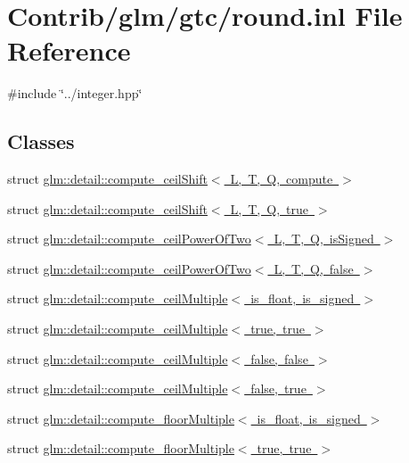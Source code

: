 \hypertarget{round_8inl}{}\section{Contrib/glm/gtc/round.inl File Reference}
\label{round_8inl}
{\ttfamily \#include \char`\"{}../integer.\+hpp\char`\"{}}\newline
\subsection*{Classes}
\begin{DoxyCompactItemize}
\item 
struct \mbox{\hyperlink{structglm_1_1detail_1_1compute__ceil_shift}{glm\+::detail\+::compute\+\_\+ceil\+Shift$<$ L, T, Q, compute $>$}}
\item 
struct \mbox{\hyperlink{structglm_1_1detail_1_1compute__ceil_shift_3_01_l_00_01_t_00_01_q_00_01true_01_4}{glm\+::detail\+::compute\+\_\+ceil\+Shift$<$ L, T, Q, true $>$}}
\item 
struct \mbox{\hyperlink{structglm_1_1detail_1_1compute__ceil_power_of_two}{glm\+::detail\+::compute\+\_\+ceil\+Power\+Of\+Two$<$ L, T, Q, is\+Signed $>$}}
\item 
struct \mbox{\hyperlink{structglm_1_1detail_1_1compute__ceil_power_of_two_3_01_l_00_01_t_00_01_q_00_01false_01_4}{glm\+::detail\+::compute\+\_\+ceil\+Power\+Of\+Two$<$ L, T, Q, false $>$}}
\item 
struct \mbox{\hyperlink{structglm_1_1detail_1_1compute__ceil_multiple}{glm\+::detail\+::compute\+\_\+ceil\+Multiple$<$ is\+\_\+float, is\+\_\+signed $>$}}
\item 
struct \mbox{\hyperlink{structglm_1_1detail_1_1compute__ceil_multiple_3_01true_00_01true_01_4}{glm\+::detail\+::compute\+\_\+ceil\+Multiple$<$ true, true $>$}}
\item 
struct \mbox{\hyperlink{structglm_1_1detail_1_1compute__ceil_multiple_3_01false_00_01false_01_4}{glm\+::detail\+::compute\+\_\+ceil\+Multiple$<$ false, false $>$}}
\item 
struct \mbox{\hyperlink{structglm_1_1detail_1_1compute__ceil_multiple_3_01false_00_01true_01_4}{glm\+::detail\+::compute\+\_\+ceil\+Multiple$<$ false, true $>$}}
\item 
struct \mbox{\hyperlink{structglm_1_1detail_1_1compute__floor_multiple}{glm\+::detail\+::compute\+\_\+floor\+Multiple$<$ is\+\_\+float, is\+\_\+signed $>$}}
\item 
struct \mbox{\hyperlink{structglm_1_1detail_1_1compute__floor_multiple_3_01true_00_01true_01_4}{glm\+::detail\+::compute\+\_\+floor\+Multiple$<$ true, true $>$}}

\end{DoxyCompactItemize}
